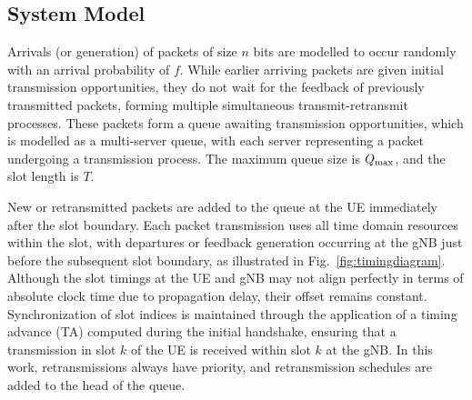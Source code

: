 

\subsection{System Model}
Arrivals (or generation) of packets of size $n$ bits are modelled to occur randomly with an arrival probability of $f$.
While earlier arriving packets are given initial transmission opportunities, they do not wait for the feedback of previously transmitted packets, forming multiple simultaneous transmit-retransmit processes.
These packets form a queue awaiting transmission opportunities, which is modelled as a multi-server queue, with each server representing a packet undergoing a transmission process.
The maximum queue size is $Q_{\mathrm{max}}$, and the slot length is $T$. 


New or retransmitted packets are added to the queue at the UE immediately after the slot boundary. 
Each packet transmission uses all time domain resources within the slot, with departures or feedback generation occurring at the gNB just before the subsequent slot boundary, as illustrated in Fig.~\ref{fig:timingdiagram}. Although the slot timings at the UE and gNB may not align perfectly in terms of absolute clock time due to propagation delay, their offset remains constant. Synchronization of slot indices is maintained through the application of a timing advance (TA) computed during the initial handshake, ensuring that a transmission in slot $k$ of the UE is received within slot $k$ at the gNB.
In this work, retransmissions always have priority, and retransmission schedules are added to the head of the queue. 


